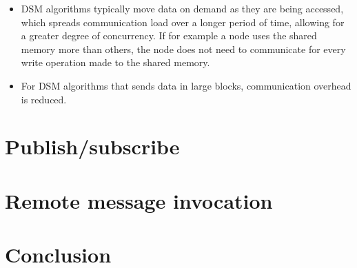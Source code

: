 \begin{itemize}
 	\item DSM algorithms typically move data on demand as they are being accessed, which spreads communication load over a longer period of time, allowing for a greater degree of concurrency. If for example a node uses the shared memory more than others, the node does not need to communicate for every write operation made to the shared memory.
 	\item For DSM algorithms that sends data in large blocks, communication overhead is reduced. 
\end{itemize} 
 









\section{Publish/subscribe}




\section{Remote message invocation}


\section{Conclusion}

